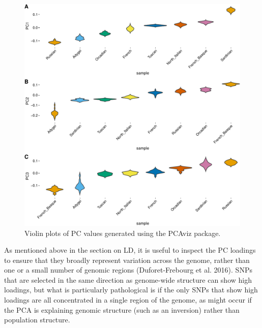 \documentclass[smallextended]{svmult}       %
\begin{document}
\begin{figure}
\includegraphics[width=1\linewidth]{plot/unnamed-chunk-21-1} \caption{Violin plots of PC values generated using the PCAviz package.}\label{fig:unnamed-chunk-21}
\end{figure}

As mentioned above in the section on LD, it is useful to inspect the PC
loadings to ensure that they broadly represent variation across the
genome, rather than one or a small number of genomic regions
(Duforet-Frebourg et al. 2016). SNPs that are selected in the same
direction as genome-wide structure can show high loadings, but what is
particularly pathological is if the only SNPs that show high loadings
are all concentrated in a single region of the genome, as might occur if
the PCA is explaining genomic structure (such as an inversion) rather
than population structure.
\end{document}

